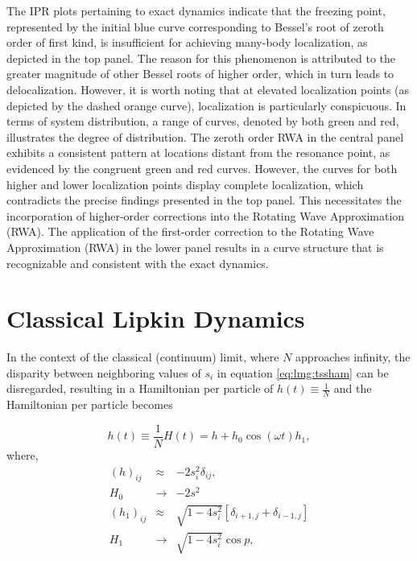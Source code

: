 \documentclass[%
reprint,
superscriptaddress,
amsmath,amssymb,
aps,
prb,
showkeys,
]{revtex4-2}
\begin{document}
	The IPR plots pertaining to exact dynamics indicate that the freezing point, represented by the initial blue curve corresponding to Bessel's root of zeroth order of first kind, is insufficient for achieving many-body localization, as depicted in the top panel. The reason for this phenomenon is attributed to the greater magnitude of other Bessel roots of higher order, which in turn leads to delocalization. However, it is worth noting that at elevated localization points (as depicted by the dashed orange curve), localization is particularly conspicuous. In terms of system distribution, a range of curves, denoted by both green and red, illustrates the degree of distribution. The zeroth order RWA in the central panel exhibits a consistent pattern at locations distant from the resonance point, as evidenced by the congruent green and red curves. However, the curves for both higher and lower localization points display complete localization, which contradicts the precise findings presented in the top panel. This necessitates the incorporation of higher-order corrections into the Rotating Wave Approximation (RWA). The application of the first-order correction to the Rotating Wave Approximation (RWA) in the lower panel results in a curve structure that is recognizable and consistent with the exact dynamics.
	
	\section{\label{sec:level4}Classical Lipkin Dynamics}
	In the context of the classical (continuum) limit, where $N$ approaches infinity, the disparity between neighboring values of $s_i$ in equation \ref{eq:lmg:tssham} can be disregarded, resulting in a Hamiltonian per particle of $h(t)\equiv \frac{1}{N}$ and the Hamiltonian per particle becomes
	
	\begin{equation}
	h(t)\equiv \frac{1}{N}H(t) = h + h_0\cos{(\omega t)}h_1,
	\end{equation}
	where,
	\begin{eqnarray}
	(h)_{ij} &\approx& - 2s^2_i \delta_{ij},\nonumber\\
	H_0 &\rightarrow& -2s^2\nonumber\\
	(h_1)_{ij} &\approx& \sqrt{1 - 4s^2_i}\left[\delta_{i+1, j}  + \delta_{i-1,j}\right]\nonumber\\
	H_1 &\rightarrow& \sqrt{1 - 4s^2_i}\cos{p},
	\end{eqnarray}
	
\end{document}
